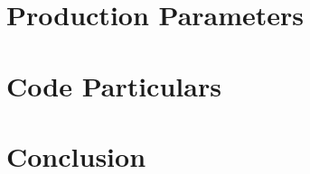 \documentclass[conference]{IEEEtran}
\begin{document}
\section{Production Parameters}
\section{Code Particulars}




\section{Conclusion}



\end{document}
